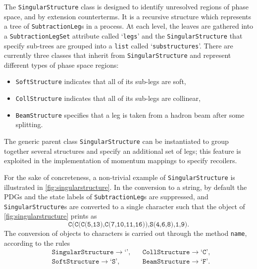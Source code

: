 \documentclass[11pt,a4paper]{article}
\begin{document}
The \texttt{SingularStructure} class is designed to identify
unresolved regions of phase space, and by extension counterterms.
It is a recursive structure which represents a tree of \texttt{SubtractionLeg}s
in a process.
At each level, the leaves are gathered
into a \texttt{SubtractionLegSet} attribute called `\texttt{legs}'
and the \texttt{SingularStructure} that specify sub-trees are grouped
into a \texttt{list} called `\texttt{substructures}'.
There are currently three classes that inherit from \texttt{SingularStructure}
and represent different types of phase space regions:
\begin{itemize}
	\item \texttt{SoftStructure} indicates that all of its sub-legs are soft,
	\item \texttt{CollStructure} indicates
		that all of its sub-legs are collinear,
	\item \texttt{BeamStructure} specifies that a leg is taken from a hadron
		beam after some splitting.
\end{itemize}
The generic parent class \texttt{SingularStructure} can be instantiated
to group together several structures and specify an additional set of legs;
this feature is exploited in the implementation of momentum mappings
to specify recoilers.

For the sake of concreteness,
a non-trivial example of \texttt{SingularStructure}
is illustrated in \cref{fig:singularstructure}.
In the conversion to a string, by default the PDGs and the state labels
of \texttt{SubtractionLeg}s are suppressed,
and \texttt{SingularStructure}s are converted to a single character
such that the object of \cref{fig:singularstructure} prints as
\begin{equation}
	\texttt{C(C(C(5,13),C(7,10,11,16)),S(4,6,8),1,9)}.
\end{equation}
The conversion of objects to characters is carried out
through the method \texttt{name}, according to the rules
\begin{equation}
\begin{aligned}
	&\texttt{SingularStructure} \to \texttt{`'}, &
	&\texttt{CollStructure} \to \texttt{`C'}, \\
	&\texttt{SoftStructure} \to \texttt{`S'}, &
	&\texttt{BeamStructure} \to \texttt{`F'}.
\end{aligned}
\end{equation}
\end{document}
